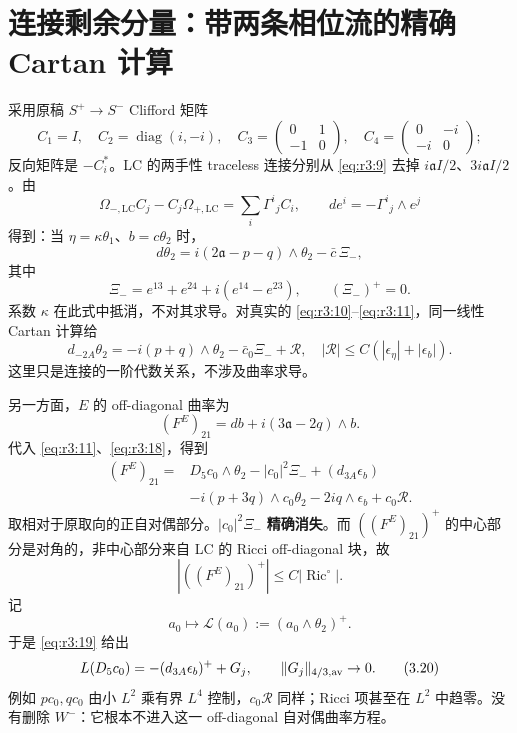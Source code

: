 \documentclass[UTF8,11pt,fontset=none]{ctexart}
\begin{document}
\section{连接剩余分量：带两条相位流的精确 Cartan 计算}\label{ch3:ux8fdeux63a5ux5269ux4f59ux5206ux91cfux5e26ux4e24ux6761ux76f8ux4f4dux6d41ux7684ux7cbeux786e-cartan-ux8ba1ux7b97}

采用原稿 \(S^+\to S^-\) Clifford 矩阵 \[
 C_1=I,\quad C_2=\operatorname{diag}(i,-i),\quad
 C_3=\begin{pmatrix}0&1\\-1&0\end{pmatrix},\quad
 C_4=\begin{pmatrix}0&-i\\-i&0\end{pmatrix};
\] 反向矩阵是 \(-C_i^*\)。LC 的两手性 traceless 连接分别从 \eqref{eq:r3:9} 去掉 \(i\mathfrak a I/2\)、\(3i\mathfrak a I/2\)。由 \[
 \Omega_{-,\mathrm{LC}}C_j-C_j\Omega_{+,\mathrm{LC}}
       =\sum_i\Gamma^i{}_j C_i,
 \qquad de^i=-\Gamma^i{}_j\wedge e^j
\] 得到：当 \(\eta=\kappa\theta_1\)、\(b=c\theta_2\) 时， \[
 \boxed{d\theta_2=i(2\mathfrak a-p-q)\wedge\theta_2
                    -\bar c\,\Xi_-,}
 \tag{3.17}\label{eq:r3:17}
\] 其中 \[
 \Xi_-=e^{13}+e^{24}+i(e^{14}-e^{23}),\qquad (\Xi_-)^+=0.
\] 系数 \(\kappa\) 在此式中抵消，不对其求导。对真实的 \eqref{eq:r3:10}--\eqref{eq:r3:11}，同一线性 Cartan 计算给 \[
 d_{-2A}\theta_2=-i(p+q)\wedge\theta_2-\bar c_0\Xi_-+\mathcal R,
 \quad |\mathcal R|\le C(|\epsilon_\eta|+|\epsilon_b|).
 \tag{3.18}\label{eq:r3:18}
\] 这里只是连接的一阶代数关系，不涉及曲率求导。

另一方面，\(E\) 的 off-diagonal 曲率为 \[
 (F^E)_{21}=db+i(3\mathfrak a-2q)\wedge b.
\] 代入 \eqref{eq:r3:11}、\eqref{eq:r3:18}，得到 \[
 \begin{aligned}
 (F^E)_{21}={}&D_5c_0\wedge\theta_2-|c_0|^2\Xi_-
       +(d_{3A}\epsilon_b)\\
 &-i(p+3q)\wedge c_0\theta_2
       -2iq\wedge\epsilon_b+c_0\mathcal R.
 \end{aligned}
 \tag{3.19}\label{eq:r3:19}
\] 取相对于原取向的正自对偶部分。\(|c_0|^2\Xi_-\) \textbf{精确消失}。而 \(((F^E)_{21})^+\) 的中心部分是对角的，非中心部分来自 LC 的 Ricci off-diagonal 块，故 \[
 |((F^E)_{21})^+|\le C|\operatorname{Ric}^{\circ}|.
\] 记 \[
 a_0\mapsto\mathcal L(a_0):=(a_0\wedge\theta_2)^+.
\] 于是 \eqref{eq:r3:19} 给出 \[
 \mathcal L(D_5c_0)=-(d_{3A}\epsilon_b)^++G_j,
 \qquad \|G_j\|_{4/3,\rm av}\to0.
 \tag{3.20}\label{eq:r3:20}
\] 例如 \(pc_0,qc_0\) 由小 \(L^2\) 乘有界 \(L^4\) 控制，\(c_0\mathcal R\) 同样；Ricci 项甚至在 \(L^2\) 中趋零。没有删除 \(W^-\)：它根本不进入这一 off-diagonal 自对偶曲率方程。
\end{document}
